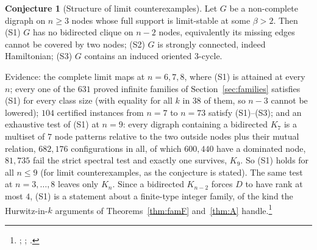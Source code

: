 \documentclass[11pt]{article}
\theoremstyle{definition}
\newtheorem{conjecture}[theorem]{Conjecture}
\begin{document}
{\begin{conjecture}[Structure of limit counterexamples]\label{conj:S}
Let $G$ be a non-complete digraph on $n\ge3$ nodes whose full support is limit-stable at some $\beta>2$. Then
(S1) $G$ has no bidirected clique on $n-2$ nodes, equivalently its missing edges cannot be covered by two nodes;
(S2) $G$ is strongly connected, indeed Hamiltonian; (S3) $G$ contains an induced oriented $3$-cycle.
\end{conjecture}
Evidence: the complete limit maps at $n=6,7,8$, where (S1) is attained at every $n$; every one of the $631$ proved
infinite families of Section~\ref{sec:families} satisfies (S1) for every class size (with equality for all $k$ in $38$ of
them, so $n-3$ cannot be lowered); $104$ certified instances from $n=7$ to $n=73$ satisfy (S1)--(S3); and an exhaustive
test of (S1) at $n=9$: every digraph containing a bidirected $K_7$ is a multiset of $7$ node patterns relative to the two
outside nodes plus their mutual relation, $682{,}176$ configurations in all, of which $600{,}440$ have a dominated node,
$81{,}735$ fail the strict spectral test and exactly one survives, $K_9$. So (S1) holds for all $n\le9$ (for limit counterexamples, as the conjecture is stated). The same test at
$n=3,\dots,8$ leaves only $K_n$. Since a bidirected $K_{n-2}$ forces $D$ to have rank at most $4$, (S1) is a statement about a
finite-type integer family, of the kind the Hurwitz-in-$k$ arguments of Theorems~\ref{thm:famF} and~\ref{thm:A}
handle.\footnote{; ;
.}

}
\end{document}
